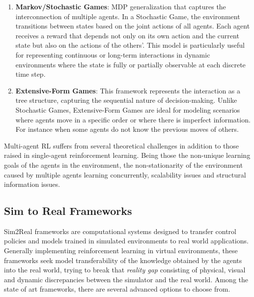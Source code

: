 \begin{enumerate}
	\item \textbf{Markov/Stochastic Games}: MDP generalization that captures the interconnection of multiple agents. In a Stochastic Game, the environment transitions between states based on the joint actions of all agents. Each agent receives a reward that depends not only on its own action and the current state but also on the actions of the others'. This model is particularly useful for representing continuous or long-term interactions in dynamic environments where the state is fully or partially observable at each discrete time step.
	
	\item \textbf{Extensive-Form Games}: This framework represents the interaction as a tree structure, capturing the sequential nature of decision-making. Unlike Stochastic Games, Extensive-Form Games are ideal for modeling scenarios where agents move in a specific order or where there is imperfect information. For instance when some agents do not know the previous moves of others. 
\end{enumerate}

Multi-agent RL suffers from several theoretical challenges in addition to those raised in single-agent reinforcement learning. Being those the non-unique learning goals of the agents in the environment, the non-stationarity of the environment caused by multiple agents learning concurrently, scalability issues and structural information issues.

\subsection{Sim to Real Frameworks}
\label{sec:sim2realframeworks}
Sim2Real frameworks are computational systems designed to transfer control policies and models trained in simulated environments to real world applications. Generally implementing reinforcement learning in virtual environments, these frameworks seek model transferability of the knowledge obtained by the agents into the real world, trying to break that \textit{reality gap} consisting of physical, visual and dynamic discrepancies between the simulator and the real world. Among the state of art frameworks, there are several advanced options to choose from. 

